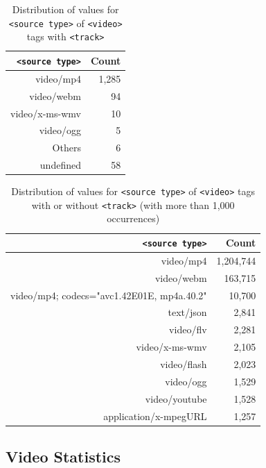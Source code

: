 \documentclass{sig-alternate}
\begin{document}
\begin{table}[t!]
  \raggedleft
  \footnotesize  
  \begin{tabular}{ r | r }
    \texttt{<source type>} & Count \\
    \hline
    video/mp4 & 1,285\\
    video/webm & 94\\
    video/x-ms-wmv & 10\\    
    video/ogg & 5\\    
    Others & 6\\
    undefined & 58\\  
  \end{tabular}
  \caption{Distribution of values for \texttt{<source type>}
    of \texttt{<video>} tags with \texttt{<track>}}
  \label{table:type}    
\end{table}

\begin{table}[t!]
  \raggedleft
  \footnotesize  
  \begin{tabular}{ r | r }
    \texttt{<source type>} & Count \\
    \hline
    video/mp4 & 1,204,744\\
    video/webm & 163,715\\
    video/mp4; codecs="avc1.42E01E, mp4a.40.2" & 10,700\\
    text/json & 2,841\\
    video/flv & 2,281\\
    video/x-ms-wmv & 2,105\\
    video/flash & 2,023\\
    video/ogg & 1,529\\
    video/youtube & 1,528\\
    application/x-mpegURL & 1,257\\    
  \end{tabular}
  \caption{Distribution of values for \texttt{<source type>}
    of \texttt{<video>} tags with or without  \texttt{<track>}
    \tiny (with more than 1,000 occurrences)}
  \label{table:typeFull}    
\end{table}

\subsection{Video Statistics}
\end{document}

